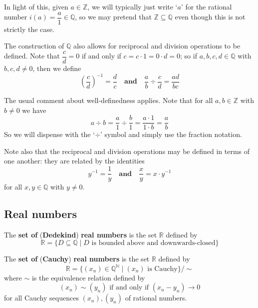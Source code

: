 In light of this, given $a \in \mathbb{Z}$, we will typically just write `$a$' for the rational number $i(a) = \dfrac{a}{1} \in \mathbb{Q}$, so we may pretend that $\mathbb{Z} \subseteq \mathbb{Q}$ even though this is not strictly the case.

The construction of $\mathbb{Q}$ also allows for reciprocal and division operations to be defined. Note that $\dfrac{c}{d} = 0$ if and only if $c = c \cdot 1 = 0 \cdot d = 0$; so if $a,b,c,d \in \mathbb{Q}$ with $b,c,d \ne 0$, then we define
\[ \left(\dfrac{c}{d} \right)^{-1} = \dfrac{d}{c} \quad \textbf{and} \quad \frac{a}{b} \div \frac{c}{d} = \dfrac{ad}{bc} \]

The usual comment about well-definedness applies. Note that for all $a,b \in \mathbb{Z}$ with $b \ne 0$ we have
\[ a \div b = \dfrac{a}{1} \div \dfrac{b}{1} = \dfrac{a \cdot 1}{1 \cdot b} = \dfrac{a}{b} \]
So we will dispense with the `$\div$' symbol and simply use the fraction notation.

Note also that the reciprocal and division operations may be defined in terms of one another: they are related by the identities
\[ y^{-1} = \dfrac{1}{y} \quad \textbf{and} \quad \dfrac{x}{y} = x \cdot y^{-1} \]
for all $x,y \in \mathbb{Q}$ with $y \ne 0$.


\subsection*{Real numbers}

\todo{}

\begin{definition}
\label{defDedekindReals}
The \textbf{set of} (\textbf{Dedekind}) \textbf{real numbers} is the set $\mathbb{R}$ defined by
\[ \mathbb{R} = \{ D \subseteq \mathbb{Q} \mid D \text{ is bounded above and downwards-closed} \} \]
\end{definition}



\begin{definition}
The \textbf{set of} (\textbf{Cauchy}) \textbf{real numbers} is the set $\mathbb{R}$ defined by
\[ \mathbb{R} = \{ (x_n) \in \mathbb{Q}^{\mathbb{N}} \mid (x_n) \text{ is Cauchy} \} / {\sim} \]
where $\sim$ is the equivalence relation defined by
\[ (x_n) \sim (y_n) \text{ if and only if } (x_n-y_n) \to 0 \]
for all Cauchy sequences $(x_n),(y_n)$ of rational numbers.
\end{definition}

